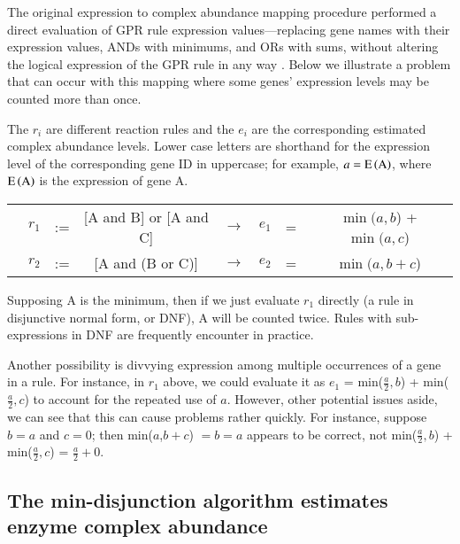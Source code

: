 The original expression to complex abundance mapping procedure
performed a direct evaluation of GPR rule expression
values---replacing gene names with their expression values, ANDs with
minimums, and ORs with sums, without altering the logical expression
of the GPR rule in any way \citep{Lee2012}. Below we illustrate a 
problem that can occur with this mapping where some genes' expression
levels may be counted more than once. 

The $r_i$ are different reaction rules and the $e_i$ are the
corresponding estimated complex abundance levels. Lower case letters
are shorthand for the expression level of the corresponding gene ID in
uppercase; for example, $a = \operatorname{E}\left(\textnormal{A}\right)$, where
$\operatorname{E}\left(\textnormal{A}\right)$ is the expression of gene A.

\begin{AlgFloat}[H]
{\setlength{\tabcolsep}{.16667em}
\begin{tabular}{cccccccc}
& $r_1$ & := & [A and B] or [A and C] & $\rightarrow$ & $e_1$  &=& $\min(a,b$) + $\min(a,c$) \\ 
& $r_2$ & := & [A and (B or C)]       & $\rightarrow$ & $e_2$  &=&  $\min(a, b + c$) 
\end{tabular} 
}
\end{AlgFloat}

Supposing A is the minimum, then if we just evaluate $r_1$ directly (a
rule in disjunctive normal form, or DNF), A will be counted twice.
Rules with sub-expressions in DNF are frequently encounter in practice.

Another possibility is divvying expression among multiple occurrences
of a gene in a rule. For instance, in $r_1$ above, we could evaluate
it as $e_1$ =
min($\frac{a}{2},b$) + min($\frac{a}{2},c$) to account for the
repeated use of $a$. However, other potential issues aside, we can see
that this can cause problems rather quickly. For instance, suppose $b
= a$ and $c = 0$; then min($a$,$b+c$) $=b=a$ appears to be correct,
not min($\frac{a}{2},b$) + min($\frac{a}{2},c$) = $\frac{a}{2} + 0$.

\subsection{The min-disjunction algorithm estimates \\enzyme complex abundance}

